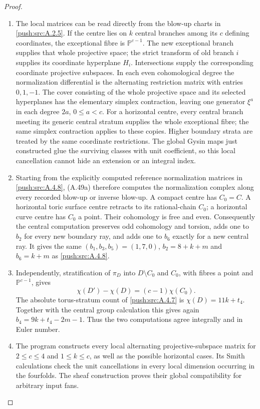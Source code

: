 \begin{proof}
\begin{enumerate}[label=\arabic*.,leftmargin=*]
\item The local matrices can be read directly from the
blow-up charts in \ref{push:src:A.2.5}. If the centre lies on $k$
central branches among its $c$ defining coordinates,
the exceptional fibre is $\mathbb P^{c-1}$. The new
exceptional branch supplies that whole projective
space; the strict transform of old branch $i$
supplies its coordinate hyperplane $H_i$.
Intersections supply the corresponding coordinate
projective subspaces. In each even cohomological
degree the normalization differential is the
alternating restriction matrix with entries
$0,1,-1$. The cover consisting of the whole
projective space and its selected hyperplanes
has the elementary simplex contraction, leaving
one generator $\xi^a$ in each degree $2a$,
$0\leq a<c$. For a horizontal centre, every
central branch meeting its generic central
stratum supplies the whole exceptional fibre;
the same simplex contraction applies to these
copies. Higher boundary strata are treated by
the same coordinate restrictions. The global
Gysin maps just constructed glue the surviving
classes with unit coefficient, so this local
cancellation cannot hide an extension or an
integral index.

\item Starting from the explicitly computed reference
normalization matrices in \ref{push:src:A.4.8}, (A.49a) therefore
computes the normalization complex along every
recorded blow-up or inverse blow-up. A compact
centre has $C_0=C$. A horizontal toric surface
centre retracts to its rational-chain $C_0$;
a horizontal curve centre has $C_0$ a point.
Their cohomology is free and even. Consequently
the central computation preserves odd cohomology
and torsion, adds one to $b_2$ for every new
boundary ray, and adds one to $b_6$ exactly for
a new central ray. It gives the same
$(b_1,b_3,b_5)=(1,7,0)$,
$b_2=8+k+m$ and $b_6=k+m$ as \ref{push:src:A.4.8}.

\item Independently, stratification of $\pi_D$ into
$D\setminus C_0$ and $C_0$, with fibres a point
and $\mathbb P^{c-1}$, gives
\[
 \chi(D')-\chi(D)=(c-1)\chi(C_0).
\]
The absolute torus-stratum count of \ref{push:src:A.4.7} is
$\chi(D)=11k+t_4$. Together with the central
group calculation this gives again
$b_4=9k+t_4-2m-1$. Thus the two computations
agree integrally and in Euler number.

\item The program 
constructs every local alternating projective-subspace
matrix for $2\leq c\leq4$ and $1\leq k\leq c$,
as well as the possible horizontal cases. Its
Smith calculations check the unit cancellations
in every local dimension occurring in the
fourfolds. The sheaf construction proves their
global compatibility for arbitrary input fans.
\end{enumerate}
\end{proof}


